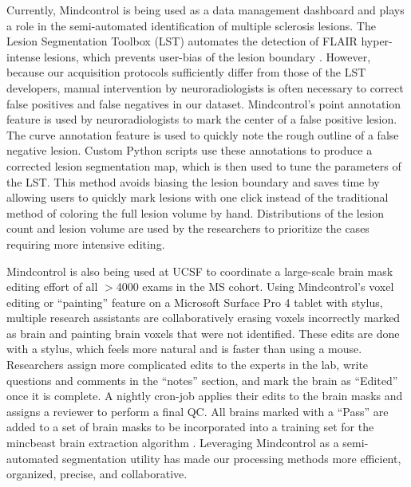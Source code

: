 Currently, Mindcontrol is being used as a data management dashboard and plays a role in the semi-automated identification of multiple sclerosis lesions. The Lesion Segmentation Toolbox (LST) automates the detection of FLAIR hyper-intense lesions, which prevents user-bias of the lesion boundary \cite{Schmidt_2012}. However, because our acquisition protocols sufficiently differ from those of the LST developers, manual intervention by neuroradiologists is often necessary to correct false positives and false negatives in our dataset. Mindcontrol's point annotation feature is used by neuroradiologists to mark the center of a false positive lesion. The curve annotation feature is used to quickly note the rough outline of a false negative lesion. Custom Python scripts use these annotations to produce a corrected lesion segmentation map, which is then used to tune the parameters of the LST. This method avoids biasing the lesion boundary and saves time by allowing users to quickly mark lesions with one click instead of the traditional method of coloring the full lesion volume by hand. Distributions of the lesion count and lesion volume are used by the researchers to prioritize the cases requiring more intensive editing.

Mindcontrol is also being used at UCSF to coordinate a large-scale brain mask editing effort of all $>$4000 exams in the MS cohort. Using Mindcontrol's voxel editing or ``painting'' feature on a Microsoft Surface Pro 4 tablet with stylus, multiple research assistants are collaboratively erasing voxels incorrectly marked as brain and painting brain voxels that were not identified.  These edits are done with a stylus, which feels more natural and is faster than using a mouse. Researchers assign more complicated edits to the experts in the lab, write questions and comments in the ``notes'' section, and mark the brain as ``Edited'' once it is complete. A nightly cron-job applies their edits to the brain masks and assigns a reviewer to perform a final QC. All brains marked with a ``Pass'' are added to a set of brain masks to be incorporated into a training set for the mincbeast brain extraction algorithm \cite{eskildsen2012beast}. Leveraging Mindcontrol as a semi-automated segmentation utility has made our processing methods more efficient, organized, precise, and collaborative.